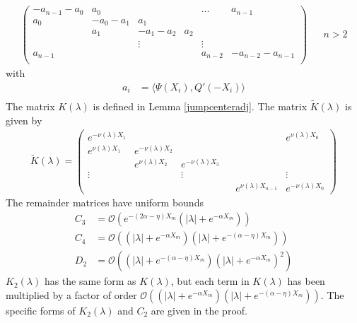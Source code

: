 \documentclass[thesis.tex]{subfiles}
\begin{document}
\begin{lemma}
\begin{align*}
\begin{pmatrix}
-a_{n-1} - a_0 & a_0 & & & \dots & a_{n-1}\\
a_0 & -a_0 - a_1 &  a_1 \\
& a_1 & -a_1 - a_2 &  a_2 \\
& & \vdots & & \vdots \\
a_{n-1} & & & & a_{n-2} & -a_{n-2} - a_{n-1} \\
\end{pmatrix} && n > 2
\end{align*}
with
\begin{align*}
a_i &= \langle \Psi(X_i), Q'(-X_i) \rangle \\
\end{align*}
The matrix $K(\lambda)$ is defined in Lemma \ref{jumpcenteradj}. The matrix $\tilde{K}(\lambda)$ is given by
\begin{align*}
\tilde{K}(\lambda) =  
\begin{pmatrix}
e^{-\nu(\lambda)X_1} & & & & & e^{\nu(\lambda)X_0} \\
e^{\nu(\lambda)X_1} & e^{-\nu(\lambda)X_2} \\
& e^{\nu(\lambda)X_2} & e^{-\nu(\lambda)X_3} \\
\vdots & & \vdots & &&  \vdots \\
& & & & e^{\nu(\lambda)X_{n-1}} & e^{-\nu(\lambda)X_0} 
\end{pmatrix}
\end{align*}
The remainder matrices have uniform bounds
\begin{align*}
C_3 &= \mathcal{O}(e^{-(2 \alpha - \eta)X_m} (|\lambda| + e^{-\alpha X_m})) \\
C_4 &= \mathcal{O}((|\lambda| + e^{-\alpha X_m})(|\lambda| + e^{-(\alpha - \eta) X_m})) \\
D_2 &= \mathcal{O}((|\lambda| + e^{-(\alpha - \eta) X_m})(|\lambda| + e^{-\alpha X_m})^2)
\end{align*}
$K_2(\lambda)$ has the same form as $K(\lambda)$, but each term in $K(\lambda)$ has been multiplied by a factor of order $\mathcal{O}((|\lambda| + e^{-\alpha X_m})(|\lambda| + e^{-(\alpha - \eta) X_m}))$. The specific forms of $K_2(\lambda)$ and $C_2$ are given in the proof.


\end{lemma}
\end{document}
